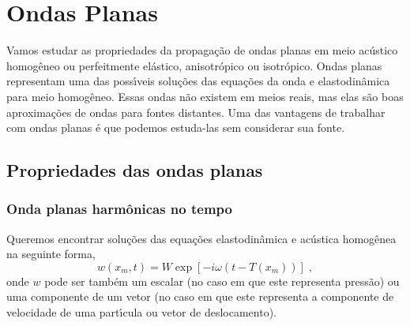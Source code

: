 \chapter{Ondas Planas} \label{ondplan}

Vamos estudar as propriedades da
propaga\c{c}\~ao de ondas planas em meio
ac\'ustico homog\^eneo ou perfeitmente el\'astico, anisotr\'opico
ou isotr\'opico. Ondas planas representam uma das poss\'{\i}veis
solu\c{c}\~oes das equa\c{c}\~oes da onda e elastodin\^amica para
meio homog\^eneo. Essas ondas n\~ao existem em meios reais, mas
elas s\~ao boas aproxima\c{c}\~oes de ondas para fontes distantes.
Uma das vantagens de trabalhar com ondas planas \'e que podemos
estuda-las sem considerar sua fonte.

\section{Propriedades das ondas planas}

\subsection{Onda planas harm\^onicas no tempo}

Queremos encontrar solu\c{c}\~oes das equa\c{c}\~oes
elastodin\^amica e ac\'ustica homog\^enea na seguinte forma,
\begin{equation}
w(x_m,t)=W\exp[-i\omega(t-T(x_m))] \;,
\end{equation}
onde $w$ pode ser tamb\'em um escalar (no caso em que este
representa press\~ao) ou uma componente de um vetor (no caso em
que este representa a componente de velocidade de uma
part\'{\i}cula ou vetor de deslocamento).

